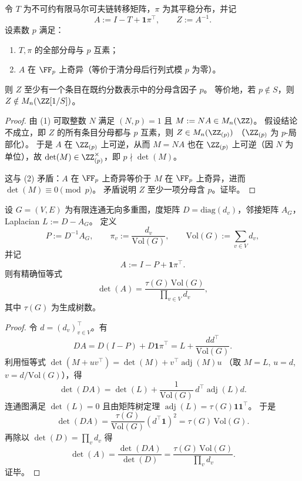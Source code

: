 \begin{proposition}\label{prop:conclusion-modp-singularity-forces-green-bad-prime}
令 \(T\) 为不可约有限马尔可夫链转移矩阵，\(\pi\) 为其平稳分布，并记
\[
A:=I-T+\mathbf 1\pi^{\!\top},
\qquad
Z:=A^{-1}.
\]
设素数 \(p\) 满足：
\begin{enumerate}
  \item \(T,\pi\) 的全部分母与 \(p\) 互素；
  \item \(A\) 在 \(\FF_p\) 上奇异（等价于清分母后行列式模 \(p\) 为零）。
\end{enumerate}
则 \(Z\) 至少有一个条目在既约分数表示中的分母含因子 \(p\)。
等价地，若 \(p\notin S\)，则 \(Z\notin M_n(\ZZ[1/S])\)。
\end{proposition}
\begin{proof}
由 (1) 可取整数 \(N\) 满足 \((N,p)=1\) 且
\(
M:=NA\in M_n(\ZZ)
\)。
假设结论不成立，即 \(Z\) 的所有条目分母都与 \(p\) 互素，则
\(
Z\in M_n(\ZZ_{(p)})
\)
（\(\ZZ_{(p)}\) 为 \(p\)-局部化）。
于是 \(A\) 在 \(\ZZ_{(p)}\) 上可逆，从而
\(
M=NA
\)
也在 \(\ZZ_{(p)}\) 上可逆（因 \(N\) 为单位），故 \(\det(M)\in \ZZ_{(p)}^\times\)，即 \(p\nmid \det(M)\)。

这与 (2) 矛盾：\(A\) 在 \(\FF_p\) 上奇异等价于 \(M\) 在 \(\FF_p\) 上奇异，进而 \(\det(M)\equiv 0\pmod p\)。
矛盾说明 \(Z\) 至少一项分母含 \(p\)。证毕。
\end{proof}

\begin{theorem}\label{thm:conclusion-kirchhoff-green-determinant-identity}
设 \(G=(V,E)\) 为有限连通无向多重图，度矩阵 \(D=\mathrm{diag}(d_v)\)，邻接矩阵 \(A_G\)，Laplacian \(L:=D-A_G\)。
定义
\[
P:=D^{-1}A_G,\qquad
\pi_v:=\frac{d_v}{\mathrm{Vol}(G)},\qquad
\mathrm{Vol}(G):=\sum_{v\in V}d_v,
\]
并记
\[
A:=I-P+\mathbf 1\pi^{\!\top}.
\]
则有精确恒等式
\[
\det(A)=\frac{\tau(G)\,\mathrm{Vol}(G)}{\prod_{v\in V}d_v},
\]
其中 \(\tau(G)\) 为生成树数。
\end{theorem}
\begin{proof}
令 \(d=(d_v)_{v\in V}^{\!\top}\)。有
\[
DA=D(I-P)+D\mathbf 1\pi^{\!\top}
=L+\frac{dd^{\!\top}}{\mathrm{Vol}(G)}.
\]
利用恒等式
\(
\det(M+uv^{\!\top})=\det(M)+v^{\!\top}\!\operatorname{adj}(M)u
\)
（取 \(M=L\), \(u=d\), \(v=d/\mathrm{Vol}(G)\)），得
\[
\det(DA)=\det(L)+\frac1{\mathrm{Vol}(G)}\,d^{\!\top}\!\operatorname{adj}(L)d.
\]
连通图满足 \(\det(L)=0\) 且由矩阵树定理
\(
\operatorname{adj}(L)=\tau(G)\mathbf 1\mathbf 1^{\!\top}
\)。
于是
\[
\det(DA)
=\frac{\tau(G)}{\mathrm{Vol}(G)}(d^{\!\top}\mathbf 1)^2
=\tau(G)\,\mathrm{Vol}(G).
\]
再除以 \(\det(D)=\prod_v d_v\) 得
\[
\det(A)=\frac{\det(DA)}{\det(D)}
=\frac{\tau(G)\,\mathrm{Vol}(G)}{\prod_v d_v}.
\]
证毕。
\end{proof}

